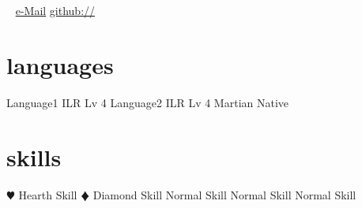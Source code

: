 \begin{aside}
    \section{\portrait{\myphoto}}
    \address
    \phone
    ~
    \href{mailto:\email}{e-Mail}
    \href{\website}{github://\firstname}
    \section{languages}
    Language1 ILR Lv 4
    Language2 ILR Lv 4
    Martian Native
    \section{skills}
    {\color{red}$\varheartsuit$} Hearth Skill
    {\color{blue}$\vardiamondsuit$} Diamond Skill
    Normal Skill
    Normal Skill
    Normal Skill
\end{aside}
